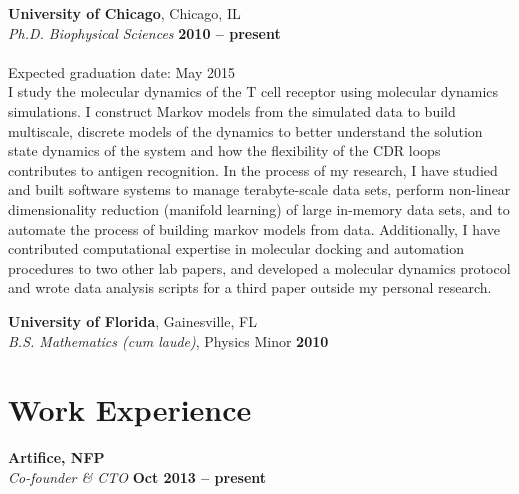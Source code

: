 \documentclass[margin,line]{resume}
\begin{document}
\begin{resume}
    \textbf{University of Chicago}, Chicago, IL \vspace{2mm} \\
    \vspace{1mm}
    \textsl{Ph.D. Biophysical Sciences} \hfill \textbf{ 2010 -- present} \vspace{-3mm}\\\vspace{-1mm}%
    \\
     Expected graduation date: May 2015 \\
     I study the molecular dynamics of the T cell receptor using molecular dynamics simulations.  I construct Markov models from the simulated data to build multiscale, discrete models of the dynamics to better understand the solution state dynamics of the system and how the flexibility of the CDR loops contributes to antigen recognition.  In the process of my research, I have studied and built software systems to manage terabyte-scale data sets, perform non-linear dimensionality reduction (manifold learning) of large in-memory data sets, and to automate the process of building markov models from data.  Additionally, I have contributed computational expertise in molecular docking and automation procedures to two other lab papers, and developed a molecular dynamics protocol and wrote data analysis scripts for a third paper outside my personal research.
    \vspace{-1mm}

    \textbf{University of Florida}, Gainesville, FL \vspace{2mm} \\
    \vspace{1mm}
    \textsl{B.S. Mathematics (cum laude)}, Physics Minor \hfill \textbf{2010}\vspace{-3mm}\\\vspace{-1mm}%
    \vspace{-2mm}

    \section{\mysidestyle Work Experience}

    \textbf{Artifice, NFP} \\
    \textsl{Co-founder \& CTO} \hfill \textbf{Oct 2013 -- present} \vspace{-3mm}


\end{resume}
\end{document}
